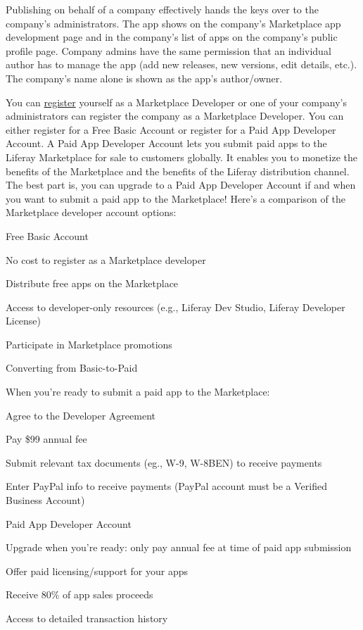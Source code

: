 Publishing on behalf of a company effectively hands the keys over to the
company's administrators. The app shows on the company's Marketplace app
development page and in the company's list of apps on the company's
public profile page. Company admins have the same permission that an
individual author has to manage the app (add new releases, new versions,
edit details, etc.). The company's name alone is shown as the app's
author/owner.

You can
\href{https://www.liferay.com/marketplace/become-a-developer}{register}
yourself as a Marketplace Developer or one of your company's
administrators can register the company as a Marketplace Developer. You
can either register for a Free Basic Account or register for a Paid App
Developer Account. A Paid App Developer Account lets you submit paid
apps to the Liferay Marketplace for sale to customers globally. It
enables you to monetize the benefits of the Marketplace and the benefits
of the Liferay distribution channel. The best part is, you can upgrade
to a Paid App Developer Account if and when you want to submit a paid
app to the Marketplace! Here's a comparison of the Marketplace developer
account options:

Free Basic Account

No cost to register as a Marketplace developer

Distribute free apps on the Marketplace

Access to developer-only resources (e.g., Liferay Dev Studio, Liferay
Developer License)

Participate in Marketplace promotions

Converting from Basic-to-Paid

When you're ready to submit a paid app to the Marketplace:

Agree to the Developer Agreement

Pay \$99 annual fee

Submit relevant tax documents (eg., W-9, W-8BEN) to receive payments

Enter PayPal info to receive payments (PayPal account must be a Verified
Business Account)

Paid App Developer Account

Upgrade when you're ready: only pay annual fee at time of paid app
submission

Offer paid licensing/support for your apps

Receive 80\% of app sales proceeds

Access to detailed transaction history

